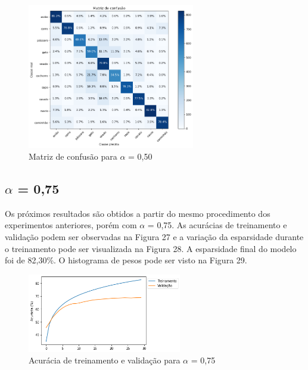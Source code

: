 \begin{figure}[H]
	\includegraphics[width=0.65\textwidth, keepaspectratio=true]{figuras/CAP4/cm_05_.png}
	\centering
	\caption[Matriz de confusão para $\alpha$ = 0,50]{Matriz de confusão para $\alpha$ = 0,50}
\end{figure}



\subsection{$\alpha$ = 0,75}

Os próximos resultados são obtidos a partir do mesmo procedimento dos experimentos anteriores, porém com $\alpha$ = 0,75. As acurácias de treinamento e validação podem ser observadas na Figura 27 e a variação da esparsidade durante o treinamento pode ser visualizada na Figura 28. A esparsidade final do modelo foi de 82,30\%. O histograma de pesos pode ser visto na Figura 29.


\begin{figure}[H]
	\includegraphics[width=0.6\textwidth, keepaspectratio=true]{figuras/CAP4/acuracia075.png}
	\centering
	\caption[Acurácia de treinamento e validação para $\alpha$ = 0,75]{Acurácia de treinamento e validação para $\alpha$ = 0,75}
\end{figure}

